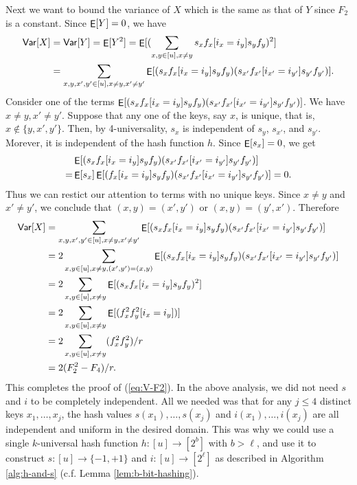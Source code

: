 \documentclass[12pt]{article}
\DeclareMathOperator*{\E}{\sf{E}}
\newcommand{\Var}{{\sf Var}}
\newcommand{\req}[1]{(\ref{#1})}
\newcommand\fct\rightarrow
\begin{document}
Next we want to bound the variance of $X$ which is the same as
that of $Y$ since $F_2$ is a constant. Since
$\E[Y]=0$, we have
\begin{align*}
\Var[X]&=\Var[Y]=\E[Y^2]=\E[(\sum_{x,y\in[u],x\neq y}s_x f_x[i_x=i_y]s_y f_y)^2]\\
&=\sum_{x,y,x',y'\in[u],x\neq y,x'\neq y'}\E[(s_x f_x[i_x=i_y]s_y f_y)
(s_{x'}f_{x'}[i_{x'}=i_{y'}]s_{y'} f_{y'})].
\end{align*}
Consider one of the terms $\E[(s_x f_x[i_x=i_y]s_y f_y)
(s_{x'}f_{x'}[i_{x'}=i_{y'}]s_{y'} f_{y'})]$. We have $x\neq y,x'\neq y'$. 
Suppose that any one of the keys,
say $x$, is unique, that is, $x\not\in\{y,x',y'\}$. Then, by
4-universality, $s_x$ is independent of $s_y$, $s_{x'}$, and $s_{y'}$.
Morever, it is independent of the hash function $h$. Since $\E[s_x]=0$,
we get
\begin{align*}
&\E[(s_x f_x[i_x=i_y]s_y f_y)
(s_{x'}f_{x'}[i_{x'}=i_{y'}]s_{y'} f_{y'})] \\
=&\E[s_x]\E[(f_x[i_x=i_y]s_y f_y) 
(s_{x'}f_{x'}[i_{x'}=i_{y'}]s_{y'} f_{y'})]=0.
\end{align*}
Thus we can restict our attention to terms with no unique keys. 
Since $x\neq y$ and $x'\neq y'$, we conclude that 
$(x,y)=(x',y')$ or $(x,y)=(y',x')$. Therefore
\begin{align*}
\Var[X]&=\sum_{x,y,x',y'\in[u],x\neq y,x'\neq y'}\E[(s_x f_x[i_x=i_y]s_y f_y)
(s_{x'}f_{x'}[i_{x'}=i_{y'}]s_{y'} f_{y'})]\\
       &=2\sum_{x,y\in[u],x\neq y,(x',y')=(x,y)}\E[(s_x f_x[i_x=i_y]s_y f_y)
(s_{x'}f_{x'}[i_{x'}=i_{y'}]s_{y'} f_{y'})]\\
&=2\sum_{x,y\in[u],x\neq y}\E[(s_x f_x[i_x=i_y]s_y f_y)^2]\\
&=2\sum_{x,y\in[u],x\neq y}\E[(f_x^2f_y^2[i_x=i_y])]\\
&=2\sum_{x,y\in[u],x\neq y}(f_x^2f_y^2)/r\\
&=2(F_2^2-F_4)/r.
\end{align*}
This completes the proof of \req{eq:V-F2}. In the above analysis, we
did not need $s$ and $i$ to be completely independent. All we needed
was that for any $j\leq 4$ distinct keys $x_1,\ldots,x_j$, the hash
values $s(x_1),\ldots,s(x_j)$ and $i(x_1),\ldots,i(x_j)$ are all
independent and uniform in the desired domain. This was why we could
use a single $k$-universal hash function $h:[u]\fct[2^b]$ with
$b>\ell$, and use it to construct $s:[u]\fct\{-1,+1\}$ and
$i:[u]\fct[2^\ell]$ as described in Algorithm \ref{alg:h-and-s}
(c.f. Lemma \ref{lem:b-bit-hashing}).
\end{document}
